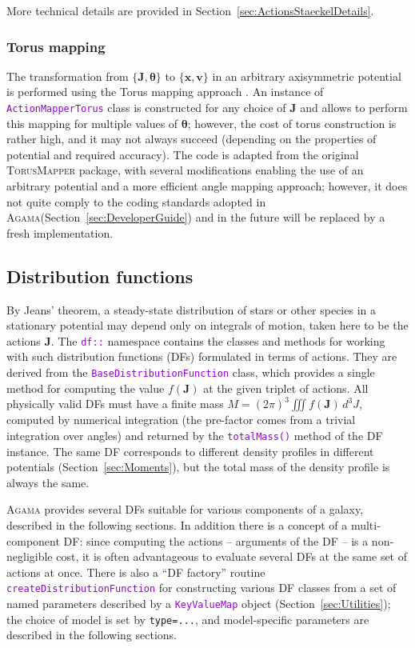 \documentclass[12pt]{article}
\newcommand{\Agama}{\textsc{Agama}\xspace}
\newcommand{\ttt}[1]{\textcolor{darkviolet}{\texttt{#1}}}
\newcommand{\ppp}[1]{\textcolor{darkolive} {\texttt{#1}}}
\newcommand{\bv}{\boldsymbol{v}}
\newcommand{\bx}{\boldsymbol{x}}
\newcommand{\bJ}{\boldsymbol{J}}
\newcommand{\bt}{\boldsymbol{\theta}}
\begin{document}
More technical details are provided in Section~\ref{sec:ActionsStaeckelDetails}.

\subsubsection{Torus mapping}  \label{sec:ActionsTorus}

The transformation from $\{\bJ, \bt\}$ to $\{\bx,\bv\}$ in an arbitrary axisymmetric potential is performed using the Torus mapping approach \cite{BinneyMcMillan2016}. An instance of \ttt{ActionMapperTorus} class is constructed for any choice of $\bJ$ and allows to perform this mapping for multiple values of $\bt$; however, the cost of torus construction is rather high, and it may not always succeed (depending on the properties of potential and required accuracy). The code is adapted from the original \textsc{TorusMapper} package, with several modifications enabling the use of an arbitrary potential and a more efficient angle mapping approach; however, it does not quite comply to the coding standards adopted in \Agama (Section~\ref{sec:DeveloperGuide}) and in the future will be replaced by a fresh implementation. 


\subsection{Distribution functions}  \label{sec:DF}

By Jeans' theorem, a steady-state distribution of stars or other species in a stationary potential may depend only on integrals of motion, taken here to be the actions $\bJ$. The \ttt{df::} namespace contains the classes and methods for working with such distribution functions (DFs) formulated in terms of actions. They are derived from the \ttt{BaseDistributionFunction} class, which provides a single method for computing the value $f(\bJ)$ at the given triplet of actions. All physically valid DFs must have a finite mass $M = (2\pi)^3 \iiint f(\bJ)\,d^3J$, computed by numerical integration (the pre-factor comes from a trivial integration over angles) and returned by the \ttt{totalMass()} method of the DF instance.
The same DF corresponds to different density profiles in different potentials (Section~\ref{sec:Moments}), but the total mass of the density profile is always the same.

\Agama provides several DFs suitable for various components of a galaxy, described in the following sections. In addition there is a concept of a multi-component DF: since computing the actions -- arguments of the DF -- is a non-negligible cost, it is often advantageous to evaluate several DFs at the same set of actions at once.
There is also a ``DF factory'' routine \ttt{createDistributionFunction} for constructing various DF classes from a set of named parameters described by a \ttt{KeyValueMap} object (Section~\ref{sec:Utilities}); the choice of model is set by \ppp{type=...}, and model-specific parameters are described in the following sections.
\end{document}
